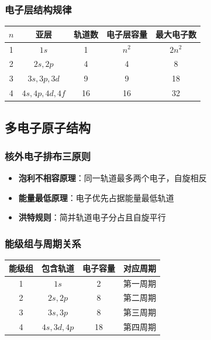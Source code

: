\documentclass{article}
\begin{document}
\subsubsection{电子层结构规律}
\begin{center}
\begin{tabular}{ccccc}
\toprule
$n$ & 亚层 & 轨道数 & 电子层容量 & 最大电子数 \\
\midrule
1 & $1s$ & 1 & $n^2$ & $2n^2$ \\
2 & $2s,2p$ & 4 & 4 & 8 \\
3 & $3s,3p,3d$ & 9 & 9 & 18 \\
4 & $4s,4p,4d,4f$ & 16 & 16 & 32 \\
\bottomrule
\end{tabular}
\end{center}

\subsection{多电子原子结构}

\subsubsection{核外电子排布三原则}
\begin{itemize}
    \item \textbf{泡利不相容原理}：同一轨道最多两个电子，自旋相反
    \item \textbf{能量最低原理}：电子优先占据能量最低轨道
    \item \textbf{洪特规则}：简并轨道电子分占且自旋平行
\end{itemize}

\subsubsection{能级组与周期关系}
\begin{center}
\begin{tabular}{cccc}
\toprule
能级组 & 包含轨道 & 电子容量 & 对应周期 \\
\midrule
1 & $1s$ & 2 & 第一周期 \\
2 & $2s,2p$ & 8 & 第二周期 \\
3 & $3s,3p$ & 8 & 第三周期 \\
4 & $4s,3d,4p$ & 18 & 第四周期 \\
\bottomrule
\end{tabular}
\end{center}
\end{document}
